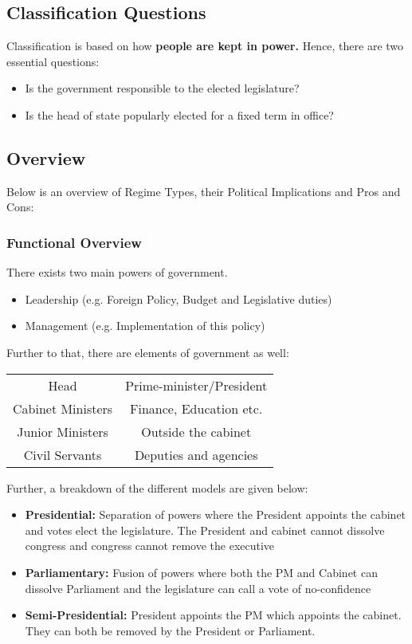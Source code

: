 \documentclass[12pt, letterpaper]{article}
\begin{document}
\subsection{Classification Questions}
Classification is based on how \textbf{people are kept in power.} Hence, there are two essential questions:
\begin{itemize}
	\item Is the government responsible to the elected legislature?
	\item Is the head of state popularly elected for a fixed term in office?
\end{itemize}

\subsection{Overview}
Below is an overview of Regime Types, their Political Implications and Pros and Cons:

\subsubsection{Functional Overview}
There exists two main powers of government.
\begin{itemize}
	\item Leadership (e.g. Foreign Policy, Budget and Legislative duties)
	\item Management (e.g. Implementation of this policy)
\end{itemize}
Further to that, there are elements of government as well:
\begin{center}
	\begin{tabular}{cc}
		Head & Prime-minister/President\\
		Cabinet Ministers & Finance, Education etc.\\
		Junior Ministers & Outside the cabinet\\
		Civil Servants & Deputies and agencies
	\end{tabular}
\end{center}
Further, a breakdown of the different models are given below:
\begin{itemize}
	\item \textbf{Presidential:} Separation of powers where the President appoints the cabinet and votes elect the legislature. The President and cabinet cannot dissolve congress and congress cannot remove the executive
	\item \textbf{Parliamentary:} Fusion of powers where both the PM and Cabinet can dissolve Parliament and the legislature can call a vote of no-confidence
	\item \textbf{Semi-Presidential:} President appoints the PM which appoints the cabinet. They can both be removed by the President or Parliament.
\end{itemize}
\end{document}
